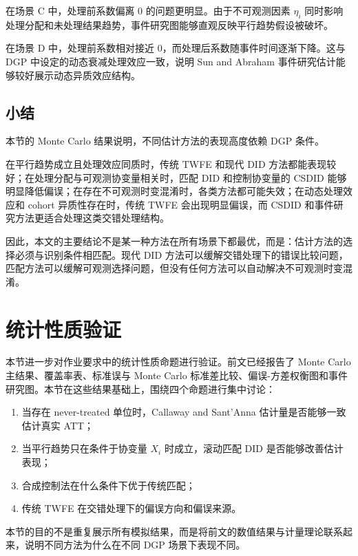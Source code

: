 \documentclass[
  fontset=windows]{ctexart}
\providecommand{\tightlist}{%
  \setlength{\itemsep}{0pt}\setlength{\parskip}{0pt}}
\begin{document}
在场景 C 中，处理前系数偏离 0 的问题更明显。由于不可观测因素 \(\eta_i\)
同时影响处理分配和未处理结果趋势，事件研究图能够直观反映平行趋势假设被破坏。

在场景 D 中，处理前系数相对接近 0，而处理后系数随事件时间逐渐下降。这与
DGP 中设定的动态衰减处理效应一致，说明 Sun and Abraham
事件研究估计能够较好展示动态异质效应结构。

\subsection{小结}\label{ux5c0fux7ed3}

本节的 Monte Carlo 结果说明，不同估计方法的表现高度依赖 DGP 条件。

在平行趋势成立且处理效应同质时，传统 TWFE 和现代 DID
方法都能表现较好；在处理分配与可观测协变量相关时，匹配 DID
和控制协变量的 CSDID
能够明显降低偏误；在存在不可观测时变混淆时，各类方法都可能失效；在动态处理效应和
cohort 异质性存在时，传统 TWFE 会出现明显偏误，而 CSDID
和事件研究方法更适合处理这类交错处理结构。

因此，本文的主要结论不是某一种方法在所有场景下都最优，而是：估计方法的选择必须与识别条件相匹配。现代
DID
方法可以缓解交错处理下的错误比较问题，匹配方法可以缓解可观测选择问题，但没有任何方法可以自动解决不可观测时变混淆。

\section{统计性质验证}\label{ux7edfux8ba1ux6027ux8d28ux9a8cux8bc1}

本节进一步对作业要求中的统计性质命题进行验证。前文已经报告了 Monte Carlo
主结果、覆盖率表、标准误与 Monte Carlo
标准差比较、偏误-方差权衡图和事件研究图。本节在这些结果基础上，围绕四个命题进行集中讨论：

\begin{enumerate}
\def\labelenumi{\arabic{enumi}.}
\tightlist
\item
  当存在 never-treated 单位时，Callaway and Sant'Anna
  估计量是否能够一致估计真实 ATT；
\item
  当平行趋势只在条件于协变量 \(X_i\) 时成立，滚动匹配 DID
  是否能够改善估计表现；
\item
  合成控制法在什么条件下优于传统匹配；
\item
  传统 TWFE 在交错处理下的偏误方向和偏误来源。
\end{enumerate}

本节的目的不是重复展示所有模拟结果，而是将前文的数值结果与计量理论联系起来，说明不同方法为什么在不同
DGP 场景下表现不同。
\end{document}
